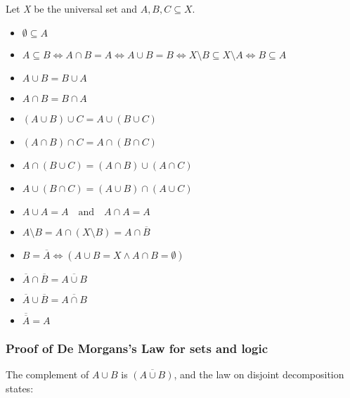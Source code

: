 Let \emph{X} be the universal set and \(A, B, C \subseteq X\).

\begin{itemize}
	
	\item \(\emptyset \subseteq A\)
	
	\item \(A \subseteq B \iff A \cap B = A \iff A \cup B = B \iff X \setminus B \subseteq X 
		  \setminus A \iff B \subseteq A\)
	
	\item \(A \cup B = B \cup A\) 
	
	\item \(A \cap B = B \cap A\) 
	
	\item \((A \cup B) \cup C = A \cup (B \cup C)\) 
	
	\item \((A \cap B) \cap C = A \cap (B \cap C)\) 
	
	\item \(A \cap (B \cup C) = (A \cap B) \cup (A \cap C)\) 
	
	\item \(A \cup (B \cap C) = (A \cup B) \cap (A \cup C)\) 
		
	\item \(A \cup A = A \quad \text{and} \quad A \cap A = A\)
	
	\item \(A \setminus B = A \cap (X \setminus B) = A \cap \overline{B}\)
	
	\item \(B = \overline{A} \iff (A \cup B = X \land A \cap B = \emptyset)\) 
	
	\item \(\overline{A} \cap \overline{B} = \overline{A \cup B}\) 
	
	\item \(\overline{A} \cup \overline{B} = \overline{A \cap B}\) 
	
	\item \(\overline{\overline{A}} = A\)

\end{itemize}

\subsubsection{Proof of De Morgans's Law for sets and logic}

The complement of \( A \cup B \) is \( \overline{(A \cup B)} \), and the law on disjoint decomposition 
states:

